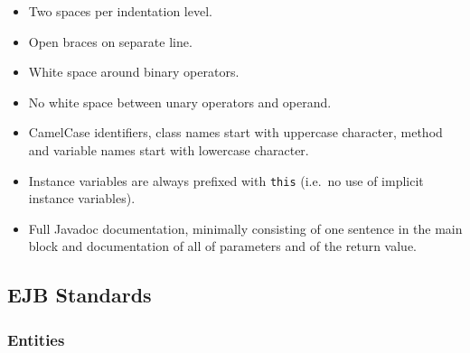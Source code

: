 \documentclass[a4paper,fleqn]{article}
\newcommand{\computercode}[1]{\texttt{#1}}
\begin{document}
\begin{itemize}

\item Two spaces per indentation level.

\item Open braces on separate line.

\item White space around binary operators.

\item No white space between unary operators and operand.

\item CamelCase identifiers, class names start with uppercase
  character, method and variable names start with lowercase character.

\item Instance variables are always prefixed with \computercode{this}
  (i.e.\ no use of implicit instance variables).

\item Full Javadoc documentation, minimally consisting of one sentence
  in the main block and documentation of all of parameters and of the
  return value.

\end{itemize}


\subsection{EJB Standards}

\subsubsection{Entities}
\end{document}
